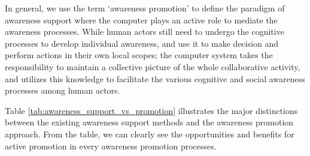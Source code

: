 In general, we use the term `awareness promotion' to define the paradigm of awareness support where the computer plays an active role to mediate the awareness processes. While human actors still need to undergo the cognitive processes to develop individual awareness, and use it to make decision and perform actions in their own local scopes; the computer system takes the responsibility to maintain a collective picture of the whole collaborative activity, and utilizes this knowledge to facilitate the various cognitive and social awareness processes among human actors.

Table \ref{tab:awareness_support_vs_promotion} illustrates the major distinctions between the existing awareness support methods and the awareness promotion approach. From the table, we can clearly see the opportunities and benefits for active promotion in every awareness promotion processes.

